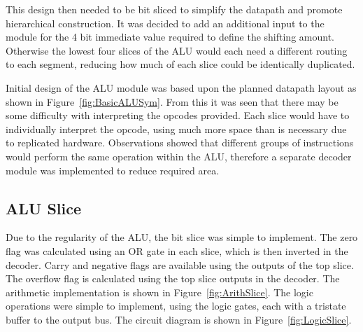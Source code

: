 This design then needed to be bit sliced to simplify the datapath and promote hierarchical construction. 
It was decided to add an additional input to the module for the 4 bit immediate value required to define the shifting amount. 
Otherwise the lowest four slices of the ALU would each need a different routing to each segment, reducing how much of each slice could be identically duplicated. 

Initial design of the ALU module was based upon the planned datapath layout as shown in Figure~\ref{fig:BasicALUSym}. 
From this it was seen that there may be some difficulty with interpreting the opcodes provided. 
Each slice would have to individually interpret the opcode, using much more space than is necessary due to replicated hardware. 
Observations showed that different groups of instructions would perform the same operation within the ALU, therefore a separate decoder module was implemented to reduce required area.

\subsection{ALU Slice}
Due to the regularity of the ALU, the bit slice was simple to implement.
The zero flag was calculated using an OR gate in each slice, which is then inverted in the decoder.
Carry and negative flags are available using the outputs of the top slice. 
The overflow flag is calculated using the top slice outputs in the decoder.
The arithmetic implementation is shown in Figure~\ref{fig:ArithSlice}. 
The logic operations were simple to implement, using the logic gates, each with a tristate buffer to the output bus.
The circuit diagram is shown in Figure~\ref{fig:LogicSlice}.


